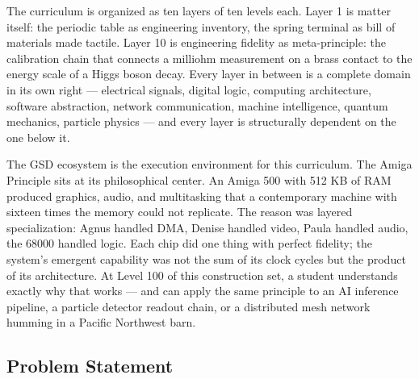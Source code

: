 \documentclass[11pt,letterpaper]{article}
\begin{document}
The curriculum is organized as ten layers of ten levels each. Layer 1 is matter itself: the
periodic table as engineering inventory, the spring terminal as bill of materials made tactile.
Layer 10 is engineering fidelity as meta-principle: the calibration chain that connects a
milliohm measurement on a brass contact to the energy scale of a Higgs boson decay. Every layer
in between is a complete domain in its own right --- electrical signals, digital logic, computing
architecture, software abstraction, network communication, machine intelligence, quantum mechanics,
particle physics --- and every layer is structurally dependent on the one below it.

The GSD ecosystem is the execution environment for this curriculum. The Amiga Principle sits at
its philosophical center. An Amiga 500 with 512 KB of RAM produced graphics, audio, and
multitasking that a contemporary machine with sixteen times the memory could not replicate.
The reason was layered specialization: Agnus handled DMA, Denise handled video, Paula handled
audio, the 68000 handled logic. Each chip did one thing with perfect fidelity; the system's
emergent capability was not the sum of its clock cycles but the product of its architecture.
At Level 100 of this construction set, a student understands exactly why that works --- and can
apply the same principle to an AI inference pipeline, a particle detector readout chain, or a
distributed mesh network humming in a Pacific Northwest barn.

\subsection{Problem Statement}
\end{document}
